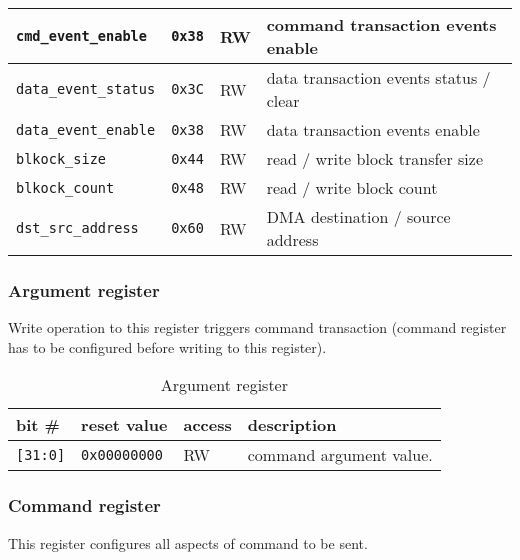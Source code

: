 \begin{table}[H]
\begin{tabular}{l|l|l|l}
                \texttt{cmd\_event\_enable} & \texttt{0x38} & RW & command transaction events enable \\ \hline
                \texttt{data\_event\_status} & \texttt{0x3C} & RW & data transaction events status / clear \\ \hline
                \texttt{data\_event\_enable} & \texttt{0x38} & RW & data transaction events enable \\ \hline
                \texttt{blkock\_size} & \texttt{0x44} & RW & read / write block transfer size \\ \hline
                \texttt{blkock\_count} & \texttt{0x48} & RW & read / write block count \\ \hline
                \texttt{dst\_src\_address} & \texttt{0x60} & RW & DMA destination / source address \\ \hline
                \hline
        \end{tabular}
        \label{tab:registers}
    \end{table}
    
    \subsubsection{Argument register}
    \label{sec:arg_reg}
    
    Write operation to this register triggers command transaction (command register has to be configured before writing to this register).
    
    \begin{table}[H]
    \caption{Argument register}
        \begin{tabular}{m{1.3cm}|m{2cm}|m{1cm}|m{8cm}}
                \rowcolor[gray]{0.7} bit \# & reset value & access & description \\ \hline \hline
                \texttt{[31:0]} & \texttt{0x00000000} & RW & command argument value. \\ \hline
                \hline
        \end{tabular}
        \label{tab:arg_reg}
    \end{table}
    
    \subsubsection{Command register}
    \label{sec:cmd_reg}
    
    This register configures all aspects of command to be sent.
    
